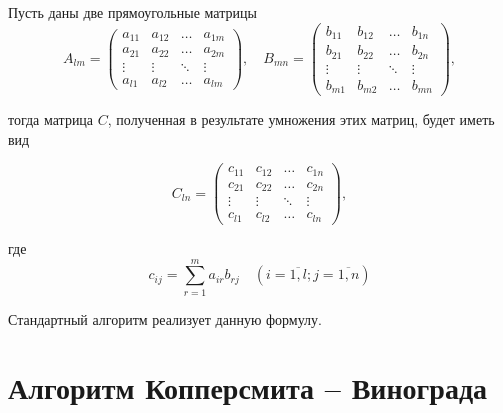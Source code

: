 \documentclass[12pt]{report}
\begin{document}
	Пусть даны две прямоугольные матрицы
	\begin{equation}
		A_{lm} = \begin{pmatrix}
			a_{11} & a_{12} & \ldots & a_{1m}\\
			a_{21} & a_{22} & \ldots & a_{2m}\\
			\vdots & \vdots & \ddots & \vdots\\
			a_{l1} & a_{l2} & \ldots & a_{lm}
		\end{pmatrix},
		\quad
			B_{mn} = \begin{pmatrix}
			b_{11} & b_{12} & \ldots & b_{1n}\\
			b_{21} & b_{22} & \ldots & b_{2n}\\
			\vdots & \vdots & \ddots & \vdots\\
			b_{m1} & b_{m2} & \ldots & b_{mn}
		\end{pmatrix},
	\end{equation}\newline\newline\newline\newline\newline\newline\newline

	тогда матрица $C$, полученная в результате умножения этих матриц, будет иметь вид
	
	\begin{equation}
		C_{ln} = \begin{pmatrix}
			c_{11} & c_{12} & \ldots & c_{1n}\\
			c_{21} & c_{22} & \ldots & c_{2n}\\
			\vdots & \vdots & \ddots & \vdots\\
			c_{l1} & c_{l2} & \ldots & c_{ln}
		\end{pmatrix},
	\end{equation}

	где
	\begin{equation}
		\label{eq:M}
		c_{ij} =
			\sum_{r=1}^{m} a_{ir}b_{rj} \quad (i=\overline{1,l}; j=\overline{1,n})
	\end{equation}

	Стандартный алгоритм реализует данную формулу.
	
	
	\section{Алгоритм Копперсмита -- Винограда}
	
\end{document}
